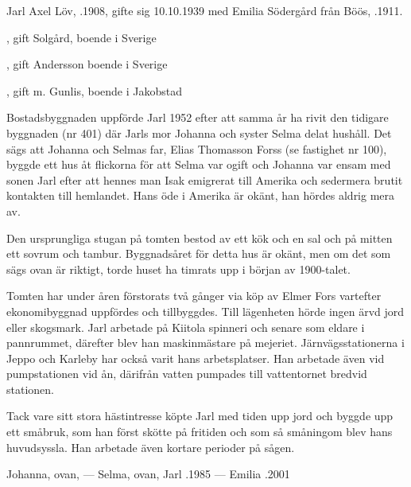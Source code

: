 Jarl Axel Löv, .1908, gifte sig 10.10.1939 med Emilia Södergård från Böös, .1911.
\begin{jhchildren}
  \item {}, gift Solgård, boende i Sverige
  \item {}, gift Andersson boende i Sverige
  \item {}, gift m. Gunlis, boende i Jakobstad
\end{jhchildren}

Bostadsbyggnaden uppförde Jarl 1952 efter att samma år ha rivit den tidigare byggnaden (nr 401) där Jarls mor Johanna och syster Selma delat hushåll. Det sägs att Johanna och Selmas far, Elias Thomasson Forss (se fastighet nr 100), byggde ett hus åt flickorna för att Selma var ogift och Johanna var ensam med sonen Jarl efter att hennes man Isak emigrerat till Amerika och sedermera brutit kontakten till hemlandet. Hans öde i Amerika är okänt, han hördes aldrig mera av.



Den ursprungliga stugan på tomten bestod av ett kök och en sal och på mitten ett sovrum och tambur. Byggnadsåret för detta hus är okänt, men om det som sägs ovan är riktigt, torde huset ha timrats upp i början av 1900-talet.

Tomten har under åren förstorats två gånger via köp av Elmer Fors vartefter ekonomibyggnad uppfördes och tillbyggdes. Till lägenheten hörde ingen ärvd jord eller skogsmark. Jarl arbetade på Kiitola spinneri och senare som eldare i pannrummet, därefter blev han maskinmästare på mejeriet. Järnvägsstationerna i Jeppo och Karleby har också varit hans arbetsplatser. Han arbetade även vid pumpstationen vid ån, därifrån vatten pumpades till vattentornet bredvid stationen.

Tack vare sitt stora hästintresse köpte Jarl med tiden upp jord och byggde upp ett småbruk, som han först skötte på fritiden och som så småningom blev hans huvudsyssla. Han arbetade även kortare perioder på sågen.

Johanna, ovan,   ---  Selma, ovan, 
Jarl .1985  ---  Emilia .2001





